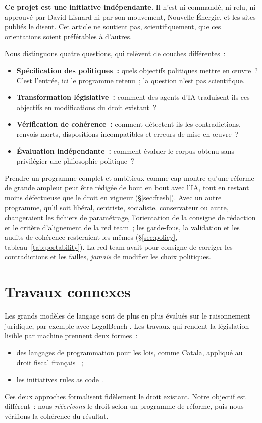 \documentclass[11pt,a4paper]{article}
\begin{document}
\textbf{Ce projet est une initiative indépendante.} Il n'est ni commandé, ni relu, ni approuvé par David Lisnard ni par son mouvement, Nouvelle Énergie, et les sites publiés le disent. Cet article ne soutient pas, scientifiquement, que ces orientations soient préférables à d'autres.

Nous distinguons quatre questions, qui relèvent de couches différentes~:
\begin{itemize}
  \item \textbf{Spécification des politiques~:} quels objectifs politiques mettre en \oe{}uvre~? C'est l'entrée, ici le programme retenu~; la question n'est pas scientifique.
  \item \textbf{Transformation législative~:} comment des agents d'IA traduisent-ils ces objectifs en modifications du droit existant~?
  \item \textbf{Vérification de cohérence~:} comment détectent-ils les contradictions, renvois morts, dispositions incompatibles et erreurs de mise en \oe{}uvre~?
  \item \textbf{Évaluation indépendante~:} comment évaluer le corpus obtenu sans privilégier une philosophie politique~?
\end{itemize}
Prendre un programme complet et ambitieux comme cap montre qu'une réforme de grande ampleur peut être rédigée de bout en bout avec l'IA, tout en restant moins défectueuse que le droit en vigueur (\S\ref{sec:fresh}). Avec un autre programme, qu'il soit libéral, centriste, socialiste, conservateur ou autre, changeraient les fichiers de paramétrage, l'orientation de la consigne de rédaction et le critère d'alignement de la red team~; les garde-fous, la validation et les audits de cohérence resteraient les mêmes (\S\ref{sec:policy}, tableau~\ref{tab:portability}). La red team avait pour consigne de corriger les contradictions et les failles, \emph{jamais} de modifier les choix politiques.

\section{Travaux connexes}

Les grands modèles de langage sont de plus en plus évalués sur le raisonnement juridique, par exemple avec LegalBench \cite{legalbench}. Les travaux qui rendent la législation lisible par machine prennent deux formes~:
\begin{itemize}
  \item des langages de programmation pour les lois, comme Catala, appliqué au droit fiscal français \cite{catala}~;
  \item les initiatives \og rules as code \fg{} \cite{oecd2020}.
\end{itemize}
Ces deux approches formalisent fidèlement le droit existant. Notre objectif est différent~: nous \emph{réécrivons} le droit selon un programme de réforme, puis nous vérifions la cohérence du résultat.
\end{document}
